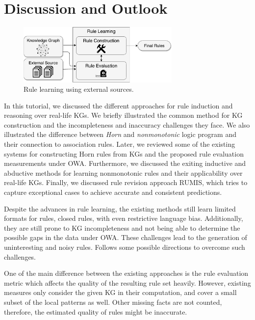 \section{Discussion and Outlook}

\begin{figure}[t]
\centering
\includegraphics[width=8cm]{figures/discussion_overview}
\caption{Rule learning using external sources.}
\label{fig:discussion_overview}
\end{figure}

In this tutorial, we discussed the different approaches for rule induction and reasoning over real-life KGs. We briefly illustrated the common method for KG construction and the incompleteness and inaccuracy challenges they face. We also illustrated the difference between \textit{Horn} and  \textit{nonmonotonic} logic program and their connection to association rules. Later, we reviewed some of the existing systems for constructing Horn rules from KGs and the proposed rule evaluation measurements under OWA. Furthermore, we discussed the exiting inductive and abductive methods for learning nonmonotonic rules and their applicability over real-life KGs. Finally, we discussed rule revision approach RUMIS, which tries to capture exceptional cases to achieve accurate and consistent predictions. 

Despite the advances in rule learning, the existing methods still learn limited formats for rules, \eg closed rules, with even restrictive language bias. Additionally, they are still prone to KG incompleteness and not being able to determine the possible gaps in the data under OWA. These challenges lead to the generation of uninteresting and noisy rules. Follows some possible directions to overcome such challenges. 


  One of the main difference between the existing approaches is the rule evaluation metric which affects the quality of the resulting rule set heavily. However,  existing measures only consider the given KG in their computation, and cover a small subset of the local patterns as well. Other missing facts are not counted, therefore, the estimated quality of rules might be inaccurate.

